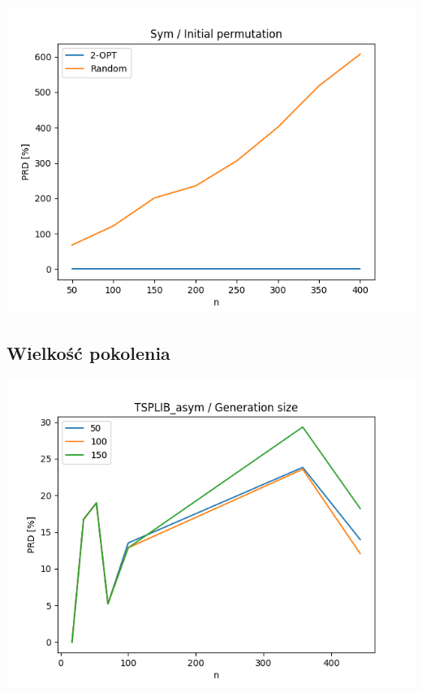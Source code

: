 \documentclass{article}
\begin{document}
\begin{center}
\includegraphics[width=\textwidth, 
                   height = 0.4\textheight, 
                   keepaspectratio]
                  {plots/sym_2_gen_rand} 
\end{center}


\subsection{Wielkość pokolenia}

\begin{center}
\includegraphics[width=\textwidth, 
                   height = 0.4\textheight, 
                   keepaspectratio]
                  {plots/tsplib_asym_3_generation_size} 
\end{center}
\end{document}
